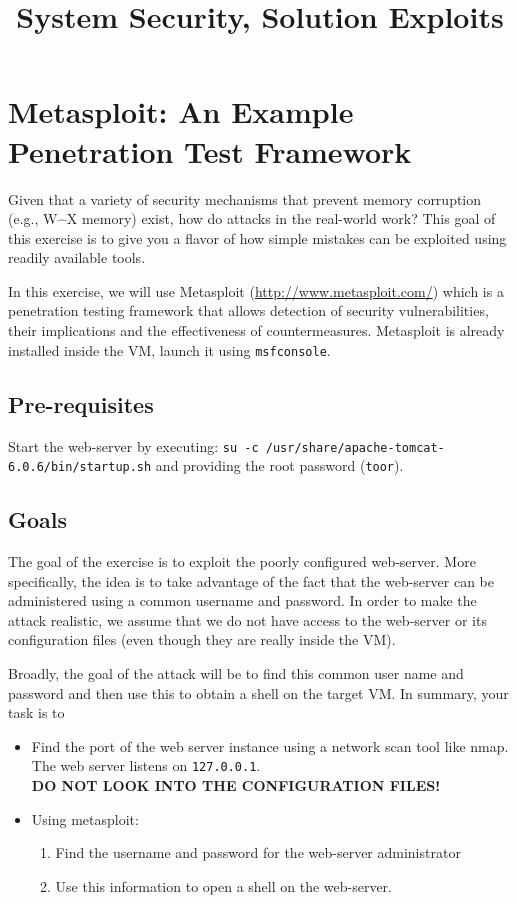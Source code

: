 \documentclass[a4paper,11pt]{article}
\title{System Security,
\ifsolution Solution \else \fi
Exploits}
\begin{document}
\maketitle
\section{Metasploit: An Example Penetration Test Framework}
Given that a variety of security mechanisms that prevent memory
corruption (e.g., W$\hat{\mbox{ }}$X memory) exist, how do attacks in the
real-world work? This goal of this exercise is to give you a flavor of how
simple mistakes can be exploited using readily available tools. 

In this exercise, we will use Metasploit
(\url{http://www.metasploit.com/}) which is a penetration testing
framework that allows detection of security vulnerabilities, their
implications and the effectiveness of countermeasures. Metasploit is already
installed inside the VM, launch it using \texttt{msfconsole}.

\subsection{Pre-requisites}
Start the web-server by executing: 
\verb|su -c /usr/share/apache-tomcat-6.0.6/bin/startup.sh|
and providing the root password (\texttt{toor}).

\subsection{Goals}
The goal of the exercise is to exploit the poorly configured
web-server. More specifically, the idea is to take advantage
of the fact that the web-server can be administered using a common
username and password. In order to make the attack realistic, we
assume that we do not have access to the web-server or its configuration files
(even though they are really inside the VM).
  
Broadly, the goal of the attack will be to find this common user
name and password and then use this to obtain a shell on the target
VM. In summary, your task is to

\begin{itemize}
\item Find the port of the web server instance using a network scan tool like
nmap. The web server listens on \texttt{127.0.0.1}.\\
\textbf{DO NOT LOOK INTO THE CONFIGURATION FILES!}
\item Using metasploit:
  \begin{enumerate}
  \item Find the username and password for the web-server
    administrator
  \item Use this information to open a shell on the web-server.
  \end{enumerate}
\end{itemize}
\end{document}
